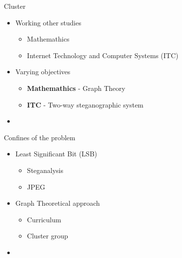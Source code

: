 
\begin{frame}{Cluster}{}
	\begin{itemize}
		\item Working other studies
        \begin{itemize}
            \item Mathemathics
            \item Internet Technology and Computer Systems (ITC)
        \end{itemize}
		\item Varying objectives
        \begin{itemize}
            \item \textbf{Mathemathics} - Graph Theory 
            \item \textbf{ITC} - Two-way steganographic system
        \end{itemize}
		\item
	\end{itemize}
\end{frame}







\begin{frame}{Confines of the problem}{}
	\begin{itemize}
		\item Least Significant Bit (LSB)
        \begin{itemize}
            \item Steganalysis
            \item JPEG
        \end{itemize}
		\item Graph Theoretical approach
        \begin{itemize}
            \item Curriculum
            \item Cluster group
        \end{itemize}
		\item
	\end{itemize}
\end{frame}

